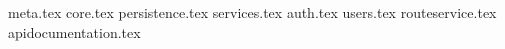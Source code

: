 {meta.tex}
{core.tex}
{persistence.tex}
{services.tex}
{auth.tex}
{users.tex}
{routeservice.tex}
{apidocumentation.tex}
